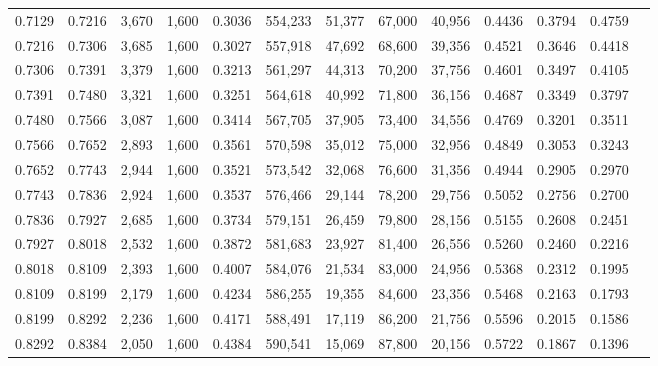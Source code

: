 \begin{tabular}{rrrrrrrrrrrrr}
0.7129 & 0.7216 &  3,670 & 1,600 &                                     0.3036 & 554,233 &  51,377 &  67,000 &  40,956 & 0.4436 & 0.3794 & 0.4759 \\
0.7216 & 0.7306 &  3,685 & 1,600 &                                     0.3027 & 557,918 &  47,692 &  68,600 &  39,356 & 0.4521 & 0.3646 & 0.4418 \\
0.7306 & 0.7391 &  3,379 & 1,600 &                                     0.3213 & 561,297 &  44,313 &  70,200 &  37,756 & 0.4601 & 0.3497 & 0.4105 \\
0.7391 & 0.7480 &  3,321 & 1,600 &                                     0.3251 & 564,618 &  40,992 &  71,800 &  36,156 & 0.4687 & 0.3349 & 0.3797 \\
0.7480 & 0.7566 &  3,087 & 1,600 &                                     0.3414 & 567,705 &  37,905 &  73,400 &  34,556 & 0.4769 & 0.3201 & 0.3511 \\
0.7566 & 0.7652 &  2,893 & 1,600 &                                     0.3561 & 570,598 &  35,012 &  75,000 &  32,956 & 0.4849 & 0.3053 & 0.3243 \\
0.7652 & 0.7743 &  2,944 & 1,600 &                                     0.3521 & 573,542 &  32,068 &  76,600 &  31,356 & 0.4944 & 0.2905 & 0.2970 \\
0.7743 & 0.7836 &  2,924 & 1,600 &                                     0.3537 & 576,466 &  29,144 &  78,200 &  29,756 & 0.5052 & 0.2756 & 0.2700 \\
0.7836 & 0.7927 &  2,685 & 1,600 &                                     0.3734 & 579,151 &  26,459 &  79,800 &  28,156 & 0.5155 & 0.2608 & 0.2451 \\
0.7927 & 0.8018 &  2,532 & 1,600 &                                     0.3872 & 581,683 &  23,927 &  81,400 &  26,556 & 0.5260 & 0.2460 & 0.2216 \\
0.8018 & 0.8109 &  2,393 & 1,600 &                                     0.4007 & 584,076 &  21,534 &  83,000 &  24,956 & 0.5368 & 0.2312 & 0.1995 \\
0.8109 & 0.8199 &  2,179 & 1,600 &                                     0.4234 & 586,255 &  19,355 &  84,600 &  23,356 & 0.5468 & 0.2163 & 0.1793 \\
0.8199 & 0.8292 &  2,236 & 1,600 &                                     0.4171 & 588,491 &  17,119 &  86,200 &  21,756 & 0.5596 & 0.2015 & 0.1586 \\
0.8292 & 0.8384 &  2,050 & 1,600 &                                     0.4384 & 590,541 &  15,069 &  87,800 &  20,156 & 0.5722 & 0.1867 & 0.1396 \\

\end{tabular}
